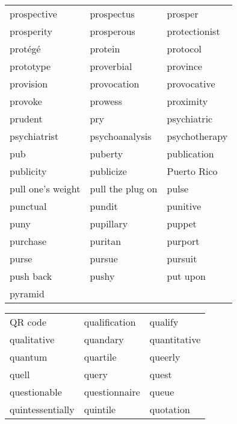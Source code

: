 \documentclass{minimal}
\begin{document}
\begin{longtable}{p{2.7cm}@{\hskip 0.2cm}p{2.7cm}@{\hskip 0.2cm}p{2.7cm}}
prospective & prospectus & prosper \\
prosperity & prosperous & protectionist \\
protégé & protein & protocol \\
prototype & proverbial & province \\
provision & provocation & provocative \\
provoke & prowess & proximity \\
prudent & pry & psychiatric \\
psychiatrist & psychoanalysis & psychotherapy \\
pub & puberty & publication \\
publicity & publicize & Puerto Rico \\
pull one's weight & pull the plug on & pulse \\
punctual & pundit & punitive \\
puny & pupillary & puppet \\
purchase & puritan & purport \\
purse & pursue & pursuit \\
push back & pushy & put upon \\
pyramid
\end{longtable}

\begin{longtable}{p{2.7cm}@{\hskip 0.2cm}p{2.7cm}@{\hskip 0.2cm}p{2.7cm}}
QR code & qualification & qualify \\
qualitative & quandary & quantitative \\
quantum & quartile & queerly \\
quell & query & quest \\
questionable & questionnaire & queue \\
quintessentially & quintile & quotation
\end{longtable}
\end{document}
